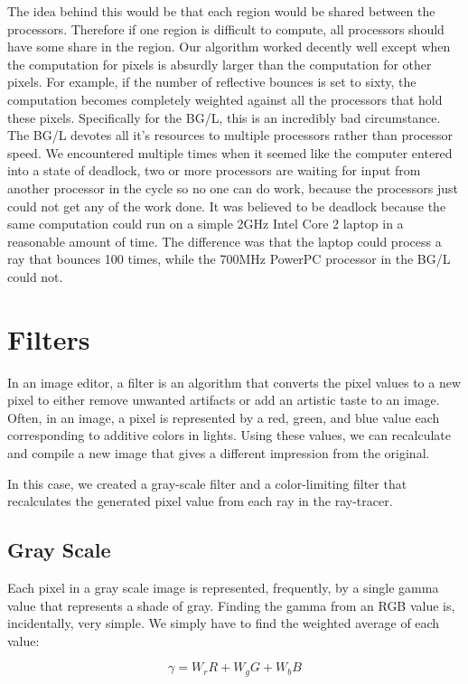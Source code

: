\documentclass{acmsiggraph}
\begin{document}
The idea behind this would be that each region would be shared between the
processors. Therefore if one region is difficult to compute, all processors
should have some share in the region. Our algorithm worked decently well except
when the computation for pixels is absurdly larger than the computation for
other pixels. For example, if the number of reflective bounces is set to sixty,
the computation becomes completely weighted against all the processors that
hold these pixels. Specifically for the BG/L, this is an incredibly bad
circumstance. The BG/L devotes all it's resources to multiple processors rather
than processor speed. We encountered multiple times when it seemed like the
computer entered into a state of deadlock, two or more processors are waiting
for input from another processor in the cycle so no one can do work, because the
processors just could not get any of the work done. It was believed to be
deadlock because the same computation could run on a simple 2GHz
Intel Core 2\texttrademark{} laptop in a reasonable amount of time. The
difference was that the laptop could process a ray that bounces 100 times, while
the 700MHz PowerPC processor in the BG/L could not.

\section{Filters}
In an image editor, a filter is an algorithm that converts the pixel values to
a new pixel to either remove unwanted artifacts or add an artistic taste to an
image.  Often, in an image, a pixel is represented by a red, green, and blue
value each corresponding to additive colors in lights.  Using these values, we
can recalculate and compile a new image that gives a different impression from
the original.

In this case, we created a gray-scale filter and a color-limiting filter that
recalculates the generated pixel value from each ray in the ray-tracer.


\subsection{Gray Scale}
Each pixel in a gray scale image is represented, frequently, by a single gamma
value that represents a shade of gray.  Finding the gamma from an RGB value
is, incidentally, very simple.  We simply have to find the weighted average of
each value:

\begin{equation}
\gamma = W_{r}R + W_{g}G + W_{b}B
\end{equation}
\end{document}
